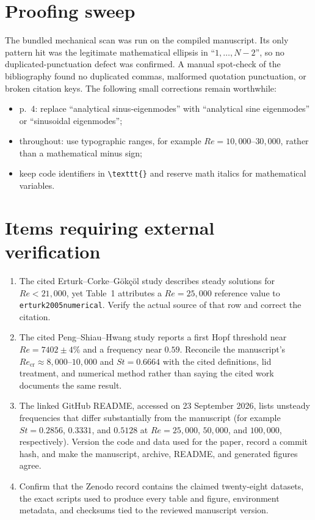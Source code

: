 \documentclass[11pt]{article}
\begin{document}
\section*{Proofing sweep}

The bundled mechanical scan was run on the compiled manuscript.  Its only pattern hit was the legitimate mathematical ellipsis in ``$1,\ldots,N-2$'', so no duplicated-punctuation defect was confirmed.  A manual spot-check of the bibliography found no duplicated commas, malformed quotation punctuation, or broken citation keys.  The following small corrections remain worthwhile:

\begin{itemize}[leftmargin=*]
  \item p.~4: replace ``analytical sinus-eigenmodes'' with ``analytical sine eigenmodes'' or ``sinusoidal eigenmodes'';
  \item throughout: use typographic ranges, for example $Re=10{,}000$--$30{,}000$, rather than a mathematical minus sign;
  \item keep code identifiers in \verb|\texttt{}| and reserve math italics for mathematical variables.
\end{itemize}

\section*{Items requiring external verification}

\begin{enumerate}[leftmargin=*]
  \item The cited Erturk--Corke--G\"ok\c{c}\"ol study describes steady solutions for $Re<21{,}000$, yet Table~1 attributes a $Re=25{,}000$ reference value to \texttt{erturk2005numerical}.  Verify the actual source of that row and correct the citation.
  \item The cited Peng--Shiau--Hwang study reports a first Hopf threshold near $Re=7402\pm4\%$ and a frequency near $0.59$.  Reconcile the manuscript's $Re_{\mathrm{cr}}\approx8{,}000$--$10{,}000$ and $St=0.6664$ with the cited definitions, lid treatment, and numerical method rather than saying the cited work documents the same result.
  \item The linked GitHub README, accessed on 23 September 2026, lists unsteady frequencies that differ substantially from the manuscript (for example $St=0.2856$, $0.3331$, and $0.5128$ at $Re=25{,}000$, $50{,}000$, and $100{,}000$, respectively).  Version the code and data used for the paper, record a commit hash, and make the manuscript, archive, README, and generated figures agree.
  \item Confirm that the Zenodo record contains the claimed twenty-eight datasets, the exact scripts used to produce every table and figure, environment metadata, and checksums tied to the reviewed manuscript version.
\end{enumerate}
\end{document}
